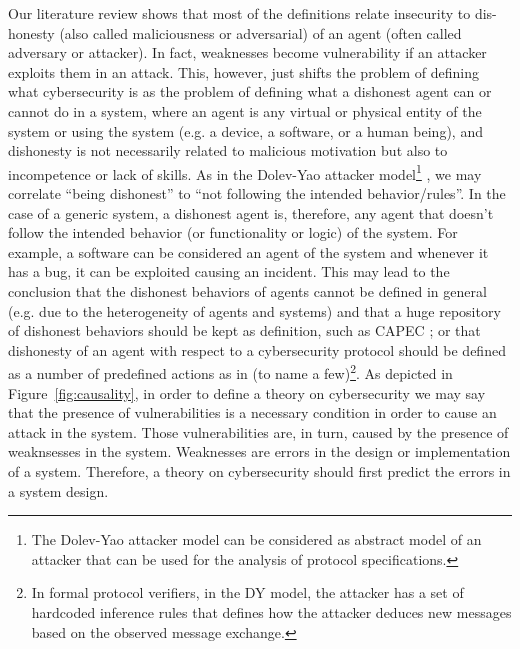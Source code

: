 \documentclass[conference]{IEEEtran}
\begin{document}
Our literature review shows that most of the definitions relate insecurity to
dis-honesty (also called maliciousness or adversarial) of an agent (often
called adversary or attacker). In fact, weaknesses become vulnerability if an
attacker exploits them in an attack.  This, however, just shifts the problem of
defining what cybersecurity is as the problem of defining what a dishonest
agent can or cannot do in a system, where an agent is any virtual or physical
entity of the system or using the system (e.g. a device, a software, or a human
being), and dishonesty is not necessarily related to malicious motivation but
also to incompetence or lack of skills. As in the Dolev-Yao attacker model\footnote{The Dolev-Yao
attacker model can be considered as abstract model of an attacker that can be
used for the analysis of protocol specifications.} \autocite{Dolev1983security}, we may
correlate ``being dishonest'' to ``not following the intended behavior/rules''.
In the case of a generic system, a dishonest agent is, therefore, any agent
that doesn't follow the intended behavior (or functionality or logic) of the
system.  For example, a software can be considered an agent of the system and
whenever it has a bug, it can be exploited causing an incident. This
may lead to the conclusion that the dishonest behaviors of agents cannot be
defined in general (e.g. due to the heterogeneity of agents and systems) and
that a huge repository of dishonest behaviors should be kept as definition, such
as CAPEC \autocite{MITRE2020CAPEC}; or that dishonesty of an agent with respect
to a cybersecurity protocol should be defined as a number of predefined actions as
in
\autocite{Turuani2006clatse,Basin2005ofmc,Armando2016satmc,Rocchetto2017interpolation}
(to name a few)\footnote{In formal protocol verifiers, in the DY model, the
attacker has a set of hardcoded inference rules that defines how the attacker
deduces new messages based on the observed message exchange.}.  As depicted in
Figure~\ref{fig:causality}, in order to define a theory on cybersecurity we may
say that the presence of vulnerabilities is a necessary condition in order to
cause an attack in the system.  Those vulnerabilities are, in turn, caused by
the presence of weaknsesses in the system.  Weaknesses are errors in the design
or implementation of a system.  Therefore, a theory on cybersecurity should
first predict the errors in a system design.
\end{document}
